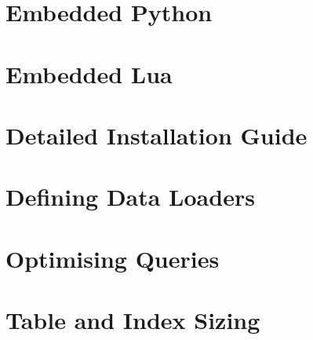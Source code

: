 \documentclass{scrreprt}
\begin{document}
\chapter{Embedded Python}\label{chpt_pythonemb}

\chapter{Embedded Lua}\label{chpt_luaemb}

\chapter{Detailed Installation Guide}\label{chpt_install}

\chapter{Defining Data Loaders}\label{chpt_loader}

\chapter{Optimising Queries}\label{chpt_opt}

\chapter{Table and Index Sizing}\label{chpt_sizing}
\end{document}
